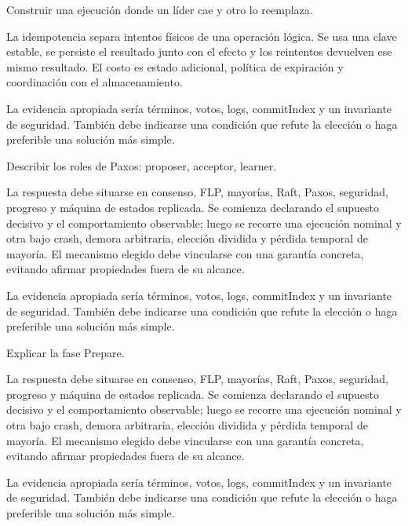 \documentclass[variant=guia,cover=institutional,mode=screen]{ua-engineering-v6-article}
\begin{document}
\begin{uaexercise}
Construir una ejecución donde un líder cae y otro lo reemplaza.
\end{uaexercise}
\begin{uaanswer}
La idempotencia separa intentos físicos de una operación lógica. Se usa una clave estable, se persiste el resultado junto con el efecto y los reintentos devuelven ese mismo resultado. El costo es estado adicional, política de expiración y coordinación con el almacenamiento.

La evidencia apropiada sería términos, votos, logs, commitIndex y un invariante de seguridad. También debe indicarse una condición que refute la elección o haga preferible una solución más simple.
\end{uaanswer}

\begin{uaexercise}
Describir los roles de Paxos: proposer, acceptor, learner.
\end{uaexercise}
\begin{uaanswer}
La respuesta debe situarse en consenso, FLP, mayorías, Raft, Paxos, seguridad, progreso y máquina de estados replicada. Se comienza declarando el supuesto decisivo y el comportamiento observable; luego se recorre una ejecución nominal y otra bajo crash, demora arbitraria, elección dividida y pérdida temporal de mayoría. El mecanismo elegido debe vincularse con una garantía concreta, evitando afirmar propiedades fuera de su alcance.

La evidencia apropiada sería términos, votos, logs, commitIndex y un invariante de seguridad. También debe indicarse una condición que refute la elección o haga preferible una solución más simple.
\end{uaanswer}

\begin{uaexercise}
Explicar la fase Prepare.
\end{uaexercise}
\begin{uaanswer}
La respuesta debe situarse en consenso, FLP, mayorías, Raft, Paxos, seguridad, progreso y máquina de estados replicada. Se comienza declarando el supuesto decisivo y el comportamiento observable; luego se recorre una ejecución nominal y otra bajo crash, demora arbitraria, elección dividida y pérdida temporal de mayoría. El mecanismo elegido debe vincularse con una garantía concreta, evitando afirmar propiedades fuera de su alcance.

La evidencia apropiada sería términos, votos, logs, commitIndex y un invariante de seguridad. También debe indicarse una condición que refute la elección o haga preferible una solución más simple.
\end{uaanswer}
\end{document}
